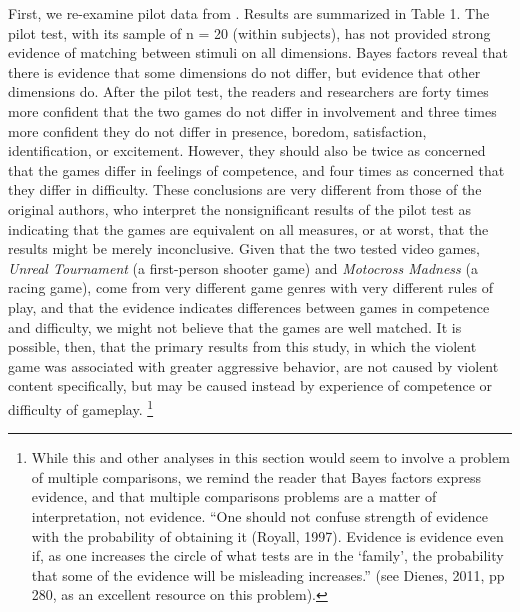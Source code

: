 \documentclass[fignum,nobf,man]{apa}
\begin{document}
First, we re-examine pilot data from \citet{Arriaga:etal:2008}. Results are summarized in Table 1. The pilot test, with its sample of n = 20 (within subjects), has not provided strong evidence of matching between stimuli on all dimensions. Bayes factors reveal that there is evidence that some dimensions do not differ, but evidence that other dimensions do. After the pilot test, the readers and researchers %
are forty times more confident that the two games do not differ in involvement and three times more confident they do not differ in presence, boredom, satisfaction, identification, or excitement. However, they should also be twice as concerned that the games differ in feelings of competence, and four times as concerned that they differ in difficulty. These conclusions are very different from those of the original authors, who interpret the nonsignificant results of the pilot test as indicating that the games are equivalent on all measures, or at worst, that the results might be merely inconclusive. Given that the two tested video games, {\em Unreal Tournament} (a first-person shooter game) and {\em Motocross Madness} (a racing game), come from very different game genres with very different rules of play, and that the evidence indicates differences between games in competence and difficulty, we might not believe that the games are well matched.  It is possible, then, that the primary results from this study, in which the violent game was associated with greater aggressive behavior, %
are not caused by violent content specifically, but may be caused instead by experience of competence or difficulty of gameplay.
\footnote{While this and other analyses in this section would seem to involve a problem of multiple comparisons, we remind the reader that Bayes factors express evidence, and that multiple comparisons problems are a matter of interpretation, not evidence. ``One should not confuse strength of evidence with the probability of obtaining it (Royall, 1997). Evidence is evidence even if, as one increases the circle of what tests are in the `family', the probability that some of the evidence will be misleading increases.'' (see Dienes, 2011, pp 280, as an excellent resource on this problem).}
\end{document}
